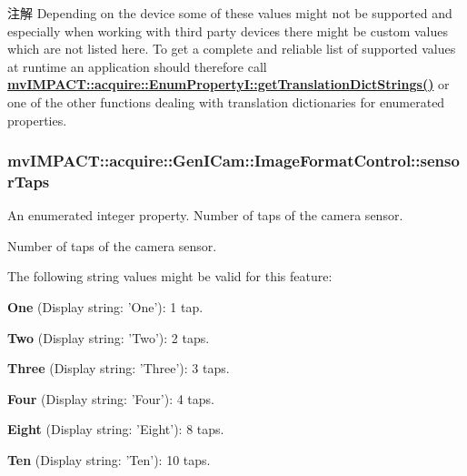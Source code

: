 \begin{DoxyNote}{注解}
Depending on the device some of these values might not be supported and especially when working with third party devices there might be custom values which are not listed here. To get a complete and reliable list of supported values at runtime an application should therefore call {\bfseries \hyperlink{classmv_i_m_p_a_c_t_1_1acquire_1_1_enum_property_i_a0ba6ccbf5ee69784d5d0b537924d26b6}{mv\+I\+M\+P\+A\+C\+T\+::acquire\+::\+Enum\+Property\+I\+::get\+Translation\+Dict\+Strings()}} or one of the other functions dealing with translation dictionaries for enumerated properties. 
\end{DoxyNote}
\hypertarget{classmv_i_m_p_a_c_t_1_1acquire_1_1_gen_i_cam_1_1_image_format_control_a061befe497a01e76983ba841c48fbbad}{
\subsubsection[{sensor\+Taps}]{ mv\+I\+M\+P\+A\+C\+T\+::acquire\+::\+Gen\+I\+Cam\+::\+Image\+Format\+Control\+::sensor\+Taps}}\label{classmv_i_m_p_a_c_t_1_1acquire_1_1_gen_i_cam_1_1_image_format_control_a061befe497a01e76983ba841c48fbbad}


An enumerated integer property. Number of taps of the camera sensor. 

Number of taps of the camera sensor.

The following string values might be valid for this feature\+:
\begin{DoxyItemize}
\item {\bfseries One} (Display string\+: 'One')\+: 1 tap.
\item {\bfseries Two} (Display string\+: 'Two')\+: 2 taps.
\item {\bfseries Three} (Display string\+: 'Three')\+: 3 taps.
\item {\bfseries Four} (Display string\+: 'Four')\+: 4 taps.
\item {\bfseries Eight} (Display string\+: 'Eight')\+: 8 taps.
\item {\bfseries Ten} (Display string\+: 'Ten')\+: 10 taps.
\end{DoxyItemize}

